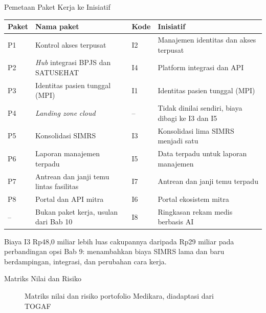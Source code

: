 \documentclass[aspectratio=169, table, 12pt]{beamer}
\begin{document}
\begin{frame}{{\Large Pemetaan Paket Kerja ke Inisiatif}}
  \scriptsize
  \begin{tabularx}{\textwidth}{lYlY}
    \hline
    \textbf{Paket} & \textbf{Nama paket} & \textbf{Kode} & \textbf{Inisiatif} \\
    \hline
    P1 & Kontrol akses terpusat & I2 & Manajemen identitas dan akses terpusat \\
    \hline
    P2 & \textit{Hub} integrasi BPJS dan SATUSEHAT & I4 & Platform integrasi dan API \\
    \hline
    P3 & Identitas pasien tunggal (MPI) & I1 & Identitas pasien tunggal (MPI) \\
    \hline
    P4 & \textit{Landing zone} \textit{cloud} & -- & Tidak dinilai sendiri, biaya dibagi ke I3 dan I5 \\
    \hline
    P5 & Konsolidasi SIMRS & I3 & Konsolidasi lima SIMRS menjadi satu \\
    \hline
    P6 & Laporan manajemen terpadu & I5 & Data terpadu untuk laporan manajemen \\
    \hline
    P7 & Antrean dan janji temu lintas fasilitas & I7 & Antrean dan janji temu terpadu \\
    \hline
    P8 & Portal dan API mitra & I6 & Portal ekosistem mitra \\
    \hline
    -- & Bukan paket kerja, usulan dari Bab 10 & I8 & Ringkasan rekam medis berbasis AI \\
    \hline
  \end{tabularx}

  \vspace{4pt}
  \small Biaya I3 Rp48,0 miliar lebih luas cakupannya daripada Rp29 miliar pada perbandingan opsi Bab 9:
  menambahkan biaya SIMRS lama dan baru berdampingan, integrasi, dan perubahan cara kerja.
\end{frame}

\begin{frame}{{\Large Matriks Nilai dan Risiko}}
  \centering
  \begin{figure}
    \resizebox{!}{0.62\textheight}{}
    \caption{Matriks nilai dan risiko portofolio Medikara, diadaptasi dari TOGAF}
  \end{figure}
\end{frame}
\end{document}
